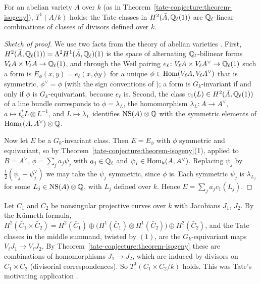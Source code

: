 \begin{corollary}\label{tate-conjecture:corollary-divisors-abelian}
For an abelian variety $A$ over $k$ (as in Theorem~\ref{tate-conjecture:theorem-isogeny}), $T^1(A/k)$ holds: the Tate classes in $H^2(\bar A, \mathbb{Q}_\ell(1))$ are $\mathbb{Q}_\ell$-linear combinations of classes of divisors
defined over $k$.
\end{corollary}

\begin{proof}[Sketch of proof]
We use two facts from the theory of abelian varieties \cite{mumford-abelian}. First, $H^2(\bar A, \mathbb{Q}_\ell(1)) = \Lambda^2H^1(\bar A, \mathbb{Q}_\ell)(1)$ is the space of alternating $\mathbb{Q}_\ell$-bilinear forms
$V_\ell A \times V_\ell A \to \mathbb{Q}_\ell(1)$, and through the Weil pairing $e_\ell \colon V_\ell A \times V_\ell A^\vee \to \mathbb{Q}_\ell(1)$ such a form is $E_\phi(x, y) = e_\ell(x, \phi y)$ for a unique
$\phi \in \operatorname{Hom}(V_\ell A, V_\ell A^\vee)$ that is symmetric, $\phi^\vee = \phi$ (with the sign conventions of \cite{mumford-abelian}); a form is $G_k$-invariant if and only if $\phi$ is $G_k$-equivariant, because
$e_\ell$ is. Second, the class $c_1(L) \in H^2(\bar A, \mathbb{Q}_\ell(1))$ of a line bundle corresponds to $\phi = \lambda_L$, the homomorphism $\lambda_L \colon A \to A^\vee$, $a \mapsto t_a^*L \otimes L^{-1}$, and
$L \mapsto \lambda_L$ identifies $\mathrm{NS}(A) \otimes \mathbb{Q}$ with the symmetric elements of $\operatorname{Hom}_k(A, A^\vee) \otimes \mathbb{Q}$.

Now let $E$ be a $G_k$-invariant class. Then $E = E_\phi$ with $\phi$ symmetric and equivariant, so by Theorem~\ref{tate-conjecture:theorem-isogeny}(1), applied to $B = A^\vee$,
$\phi = \sum_ja_j\psi_j$ with $a_j \in \mathbb{Q}_\ell$ and $\psi_j \in \operatorname{Hom}_k(A, A^\vee)$. Replacing $\psi_j$ by $\frac12(\psi_j + \psi_j^\vee)$ we may take the $\psi_j$ symmetric, since $\phi$ is. Each symmetric $\psi_j$ is
$\lambda_{L_j}$ for some $L_j \in \mathrm{NS}(A) \otimes \mathbb{Q}$, with $L_j$ defined over $k$. Hence $E = \sum_ja_jc_1(L_j)$.
\end{proof}

\begin{example}\label{tate-conjecture:example-products-curves}
Let $C_1$ and $C_2$ be nonsingular projective curves over $k$ with Jacobians $J_1$, $J_2$. By the K\"unneth formula,
$H^2(\bar C_1 \times \bar C_2) = H^2(\bar C_1) \oplus \big(H^1(\bar C_1) \otimes H^1(\bar C_2)\big) \oplus H^2(\bar C_2)$, and the Tate classes in the middle summand, twisted by $(1)$, are the $G_k$-equivariant maps
$V_\ell J_1 \to V_\ell J_2$. By Theorem~\ref{tate-conjecture:theorem-isogeny} these are combinations of homomorphisms $J_1 \to J_2$, which are induced by divisors on $C_1 \times C_2$ (divisorial
correspondences). So $T^1(C_1 \times C_2/k)$ holds. This was Tate's motivating application \cite{tate-1966}.
\end{example}

